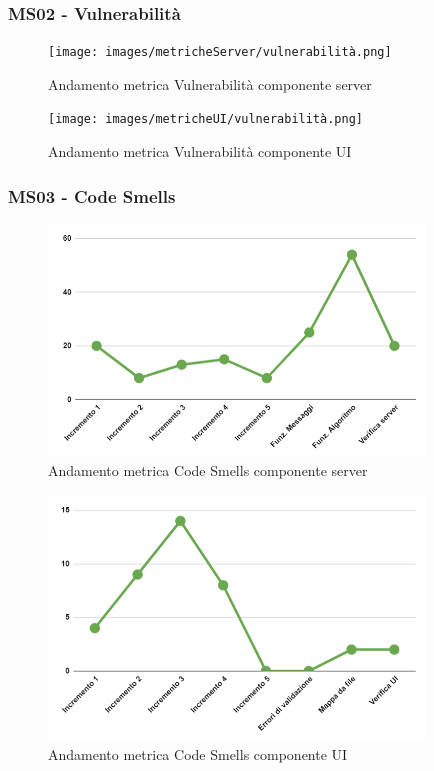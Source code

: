 \subsubsection{MS02 - Vulnerabilità}
\begin{figure}[H]
	\centering
	\texttt{[image: images/metricheServer/vulnerabilità.png]}
	\caption{Andamento metrica Vulnerabilità componente server}
\end{figure}
\begin{figure}[H]
	\centering
	\texttt{[image: images/metricheUI/vulnerabilità.png]}
	\caption{Andamento metrica Vulnerabilità componente UI}
\end{figure}

\subsubsection{MS03 - Code Smells}
\begin{figure}[H]
	\centering
	\includegraphics[width=10cm]{images/metricheServer/code_smells.png}
	\caption{Andamento metrica Code Smells componente server}
\end{figure}
\begin{figure}[H]
	\centering
	\includegraphics[width=10cm]{images/metricheUI/code_smells.png}
	\caption{Andamento metrica Code Smells componente UI}
\end{figure}
\newpage
